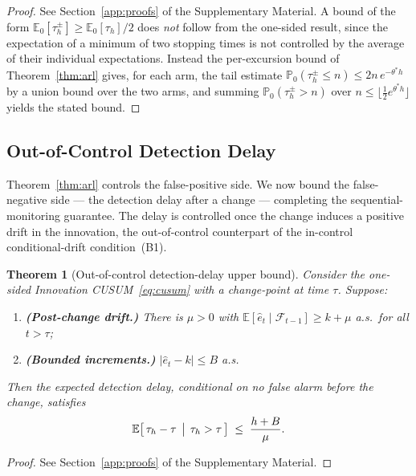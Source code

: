 \documentclass[bj,authoryear]{imsart}
\theoremstyle{plain}
\newtheorem{theorem}{Theorem}[section]
\theoremstyle{definition}
\newcommand{\E}{\mathbb{E}}
\newcommand{\Prob}{\mathbb{P}}
\newcommand{\F}{\mathcal{F}}
\newcommand{\given}{\mid}
\begin{document}
\begin{proof}
  See Section~\ref{app:proofs} of the Supplementary Material.  A bound of
  the form $\E_0[\tau_h^{\pm}]\geq\E_0[\tau_h]/2$ does \emph{not} follow
  from the one-sided result, since the expectation of a minimum of two
  stopping times is not controlled by the average of their individual
  expectations.  Instead the per-excursion bound of Theorem~\ref{thm:arl}
  gives, for each arm, the tail estimate
  $\Prob_0(\tau_h^{\pm}\leq n)\leq 2n\,e^{-\theta^\ast h}$ by a union bound
  over the two arms, and summing $\Prob_0(\tau_h^{\pm}>n)$ over
  $n\leq\lfloor\tfrac12 e^{\theta^\ast h}\rfloor$ yields the stated bound.
\end{proof}

\subsection{Out-of-Control Detection Delay}
\label{sec:delay}

Theorem~\ref{thm:arl} controls the false-positive side.  We now bound the
false-negative side --- the detection delay after a change --- completing the
sequential-monitoring guarantee.  The delay is controlled once the change
induces a positive drift in the innovation, the out-of-control counterpart of
the in-control conditional-drift condition~(B1).

\begin{theorem}[Out-of-control detection-delay upper bound]
\label{thm:delay}
  Consider the one-sided Innovation CUSUM~\eqref{eq:cusum} with a change-point
  at time $\tau$.  Suppose:
  \begin{enumerate}[label=(O\arabic*), itemsep=3pt]
    \item \textbf{(Post-change drift.)}  There is $\mu>0$ with
      $\E[\hat e_t\given\F_{t-1}]\geq k+\mu$ a.s.\ for all $t>\tau$;
    \item \textbf{(Bounded increments.)}  $|\hat e_t-k|\leq B$ a.s.
  \end{enumerate}
  Then the expected detection delay, conditional on no false alarm before the
  change, satisfies
  \begin{equation}
    \E\bigl[\,\tau_h-\tau \,\bigm|\, \tau_h>\tau\,\bigr]
    \;\leq\; \frac{h+B}{\mu}.
    \label{eq:delay}
  \end{equation}
\end{theorem}

\begin{proof}
  See Section~\ref{app:proofs} of the Supplementary Material.
\end{proof}
\end{document}
